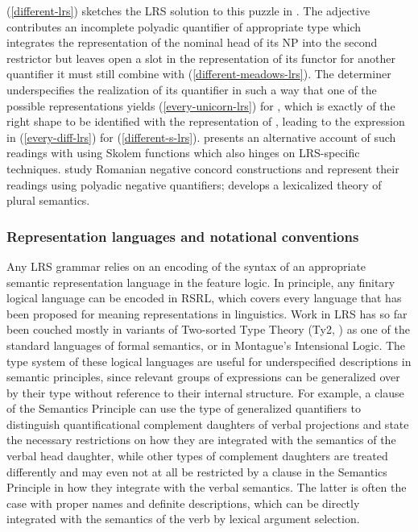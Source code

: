 \documentclass[output=paper]{langsci/langscibook}
\begin{document}
(\ref{different-lrs}) sketches the LRS solution to this puzzle in
\citet{Richter.2016}. The
adjective  contributes an incomplete polyadic
quantifier of appropriate type which integrates the representation of
the nominal head of its NP into the second restrictor but leaves open
a slot in the representation of its functor for another quantifier it
must still combine with (\ref{different-meadows-lrs}). The determiner
 underspecifies the realization of its quantifier in such
a way that one of the possible representations yields
(\ref{every-unicorn-lrs}) for , which is exactly
of the right shape to be identified with the representation of
, leading to the expression in
(\ref{every-diff-lrs}) for (\ref{different-s-lrs}).
\citet{Lahm.2016} presents an alternative account of such readings
with  using Skolem functions which also hinges on
LRS-specific techniques. \citet{IordachioaiaRichter.2015} study Romanian
negative concord constructions and represent their readings using polyadic negative
quantifiers; \citet{Lahm.2018} develops a lexicalized theory
of plural semantics.




\subsubsection{Representation languages and notational conventions}

Any LRS grammar relies on an encoding of the syntax of an appropriate semantic representation language in the feature logic. In principle, any finitary logical language can be encoded in RSRL, which covers every language that has been proposed for meaning representations in linguistics. Work in LRS has so far been couched mostly in variants of Two-sorted Type Theory (Ty2, \citealt{Gallin75a-u}) as one of the standard languages of formal semantics, or in Montague's Intensional Logic. The type system of these logical languages are useful for underspecified descriptions in semantic principles, since relevant groups of expressions can be generalized over by their type without reference to their internal structure. For example, a clause of the Semantics Principle can use the type of generalized quantifiers to distinguish quantificational complement daughters of verbal projections and state the necessary restrictions on how they are integrated with the semantics of the verbal head daughter, while other types of complement daughters are treated differently and may even not at all be restricted by a clause in the Semantics Principle in how they integrate with the verbal semantics. The latter is often the case with proper names and definite descriptions, which can be directly integrated with the semantics of the verb by lexical argument selection.
\end{document}
